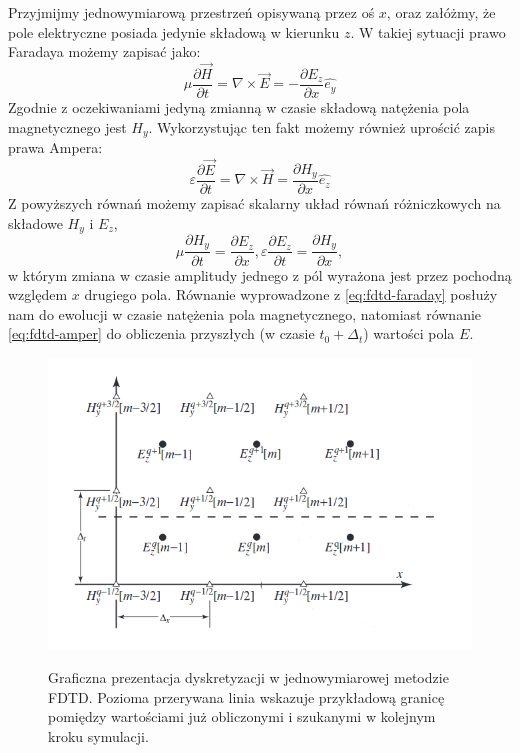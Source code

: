Przyjmijmy jednowymiarową przestrzeń opisywaną przez oś $x$, oraz załóżmy, że pole elektryczne posiada jedynie składową w kierunku $z$. W takiej sytuacji prawo Faradaya możemy zapisać jako:
\begin{equation}
\mu \frac{\partial \vec{H}}{\partial t}= \nabla \times \vec{E} = - \frac{\partial E_z}{\partial x} \hat{e_y}
\label{eq:fdtd-faraday}
\end{equation}
Zgodnie z oczekiwaniami jedyną zmianną w czasie składową natężenia pola magnetycznego jest $H_y$. Wykorzystując ten fakt możemy również uprościć zapis prawa Ampera:
\begin{equation}
\varepsilon \frac{\partial \vec{E}}{\partial t}=\nabla \times \vec{H} = \frac{\partial H_y}{\partial x} \hat{e_z}
\label{eq:fdtd-amper}
\end{equation}
Z powyższych równań możemy zapisać  skalarny układ równań różniczkowych na składowe $H_y$ i $E_z$,
\begin{equation}
\mu \frac{\partial H_y}{\partial t}=\frac{\partial E_z}{\partial x} ,
\varepsilon \frac{\partial E_z}{\partial t}=\frac{\partial H_y}{\partial x},
\end{equation} w którym zmiana w czasie amplitudy jednego z pól wyrażona jest przez pochodną względem $x$ drugiego pola. Równanie wyprowadzone z \ref{eq:fdtd-faraday} posłuży nam do ewolucji w czasie natężenia pola magnetycznego, natomiast równanie \ref{eq:fdtd-amper} do obliczenia przyszłych (w czasie $t_0 + \Delta_t$) wartości pola $E$.

\begin{figure}
\includegraphics[width=.9\textwidth]{subart/fdtd/leapfrog.png}
\label{pic:leapfrog}
\caption{Graficzna prezentacja dyskretyzacji w jednowymiarowej metodzie FDTD. Pozioma przerywana linia wskazuje przykładową granicę pomiędzy wartościami już obliczonymi i szukanymi w kolejnym kroku symulacji. }
\end{figure}


